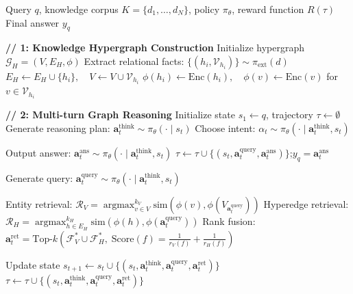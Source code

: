 \documentclass{article}
\theoremstyle{plain}
\theoremstyle{definition}
\theoremstyle{remark}
\begin{document}
\begin{algorithm}[h!t]
\small
\caption{Graph-R1: Agentic GraphRAG via End-to-end RL}
\label{alg:graph-r1}
\begin{algorithmic}[1]
\Require Query $q$, knowledge corpus $K = \{d_1, \dots, d_N\}$, policy $\pi_\theta$, reward function $R(\tau)$
\Ensure Final answer $y_q$

\vspace{1mm}
\State \textbf{// 1: Knowledge Hypergraph Construction}
\State Initialize hypergraph $\mathcal{G}_H = (V, E_H, \phi)$
    \State Extract relational facts: $\{(h_i, \mathcal{V}_{h_i})\} \sim \pi_{\text{ext}}(d)$
        \State $E_H \gets E_H \cup \{h_i\}, \quad V \gets V \cup \mathcal{V}_{h_i}$
        \State $\phi(h_i) \gets \mathrm{Enc}(h_i), \quad \phi(v) \gets \mathrm{Enc}(v)$ for $v \in \mathcal{V}_{h_i}$
    \EndFor
\EndFor

\vspace{1mm}
\State \textbf{// 2: Multi-turn Graph Reasoning}
\State Initialize state $s_1 \gets q$, trajectory $\tau \gets \emptyset$
    \State Generate reasoning plan: $\mathbf{a}_t^{\text{think}} \sim \pi_\theta(\cdot \mid s_t)$
    \State Choose intent: $\alpha_t \sim \pi_\theta(\cdot \mid \mathbf{a}_t^{\text{think}}, s_t)$

        \State Output answer: $\mathbf{a}_t^{\text{ans}} \sim \pi_\theta(\cdot \mid \mathbf{a}_t^{\text{think}}, s_t)$
        \State $\tau \gets \tau \cup \{(s_t, \mathbf{a}_t^{\text{query}}, \mathbf{a}_t^{\text{ans}})\}$;\quad \Return $y_q = \mathbf{a}_t^{\text{ans}}$

        \State Generate query: $\mathbf{a}_t^{\text{query}} \sim \pi_\theta(\cdot \mid \mathbf{a}_t^{\text{think}}, s_t)$

        \State Entity retrieval:
        $\mathcal{R}_V = \operatorname*{argmax}^{k_V}_{v \in V} \text{sim}(\phi(v), \phi(V_{\mathbf{a}_t^{\text{query}}}))$
        \State Hyperedge retrieval:
        $\mathcal{R}_H = \operatorname*{argmax}^{k_H}_{h \in E_H} \text{sim}(\phi(h), \phi(\mathbf{a}_t^{\text{query}}))$
        \State Rank fusion:
        $\mathbf{a}_t^{\text{ret}} = \text{Top-}k\left(\mathcal{F}_V^* \cup \mathcal{F}_H^*,\; \text{Score}(f) = \tfrac{1}{r_V(f)} + \tfrac{1}{r_H(f)}\right)$


        \State Update state $s_{t+1} \gets s_t \cup \{(s_t, \mathbf{a}_t^{\text{think}}, \mathbf{a}_t^{\text{query}}, \mathbf{a}_t^{\text{ret}})\}$
        \State $\tau \gets \tau \cup \{(s_t, \mathbf{a}_t^{\text{think}}, \mathbf{a}_t^{\text{query}}, \mathbf{a}_t^{\text{ret}})\}$
    \EndIf
\EndFor


\end{algorithmic}
\end{algorithm}
\end{document}
